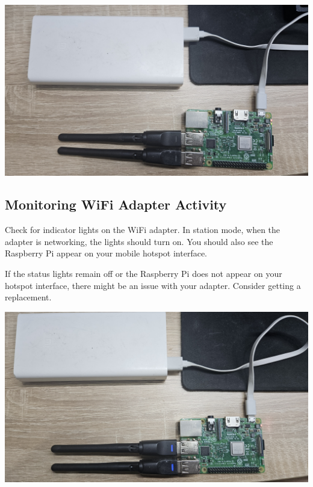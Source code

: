 \documentclass[
  letterpaper,
]{scrbook}
\begin{document}
\includegraphics{content/material/ch2/plug_external.jpg}

\subsection{Monitoring WiFi Adapter
Activity}\label{monitoring-wifi-adapter-activity}

Check for indicator lights on the WiFi adapter. In station mode, when
the adapter is networking, the lights should turn on. You should also
see the Raspberry Pi appear on your mobile hotspot interface.

\begin{tcolorbox}[enhanced jigsaw, leftrule=.75mm, opacitybacktitle=0.6, toprule=.15mm, colback=white, colbacktitle=quarto-callout-note-color!10!white, toptitle=1mm, title=\textcolor{quarto-callout-note-color}{\faInfo}\hspace{0.5em}{Note}, arc=.35mm, coltitle=black, opacityback=0, left=2mm, bottomtitle=1mm, colframe=quarto-callout-note-color-frame, titlerule=0mm, breakable, bottomrule=.15mm, rightrule=.15mm]

If the status lights remain off or the Raspberry Pi does not appear on
your hotspot interface, there might be an issue with your adapter.
Consider getting a replacement.

\end{tcolorbox}

\includegraphics{content/material/ch2/adapter_light.jpg}
\end{document}
